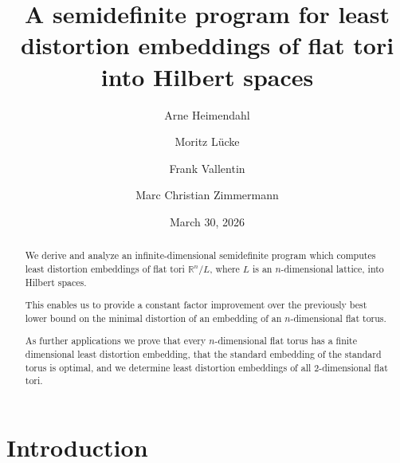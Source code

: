 \documentclass{amsart}
\newcommand{\R}{\mathbb{R}}
\begin{document}
\title{A semidefinite program for least distortion embeddings of flat tori into Hilbert spaces}

\address{A.~Heimendahl, M.~L\"ucke, F.~Vallentin,
  M.C.~Zimmermann, Department Mathematik/Informatik, Abteilung
  Mathematik, Universit\"at zu K\"oln, Weyertal~86--90, 50931 K\"oln,
  Germany}

\author{Arne Heimendahl}

\author{Moritz L\"ucke}

\author{Frank Vallentin}

\author{Marc Christian Zimmermann}

\date{March 30, 2026}


%
%
%

\begin{abstract}
  We derive and analyze an infinite-dimensional semidefinite program
  which computes least distortion embeddings of flat tori $\R^n/L$,
  where $L$ is an $n$-dimensional lattice, into Hilbert spaces.

  This enables us to provide a constant factor improvement over the
  previously best lower bound on the minimal distortion of an
  embedding of an $n$-dimensional flat torus.

  As further applications we prove that every $n$-dimensional flat
  torus has a finite dimensional least distortion embedding, that the
  standard embedding of the standard torus is optimal, and we
  determine least distortion embeddings of all $2$-dimensional flat
  tori.
\end{abstract}

%
%
%

\maketitle


%
%
%

\section{Introduction}
\end{document}
